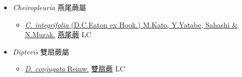 
  \begin{itemize}
 \item[] \textit{Cheiropleuria} 燕尾蕨屬
                    
  \begin{itemize}
        \item[] \href{http://www.theplantlist.org/tpl1.1/search?q=Cheiropleuria+integrifolia}{\textit{C. integrifolia} (D.C.Eaton ex Hook.) M.Kato, Y.Yatabe, Sahashi \& N.Murak.}     \href{\detokenize{http://taibnet.sinica.edu.tw/chi/taibnet_species_list.php?T2=燕尾蕨&T2_new_value=true&fr=y}}{燕尾蕨} LC
  \end{itemize}
 \item[] \textit{Dipteris} 雙扇蕨屬
                    
  \begin{itemize}
        \item[] \href{http://www.theplantlist.org/tpl1.1/search?q=Dipteris+conjugata}{\textit{D. conjugata} Reinw.}   \href{\detokenize{http://taibnet.sinica.edu.tw/chi/taibnet_species_list.php?T2=雙扇蕨&T2_new_value=true&fr=y}}{雙扇蕨} LC
  \end{itemize}
  \end{itemize}
